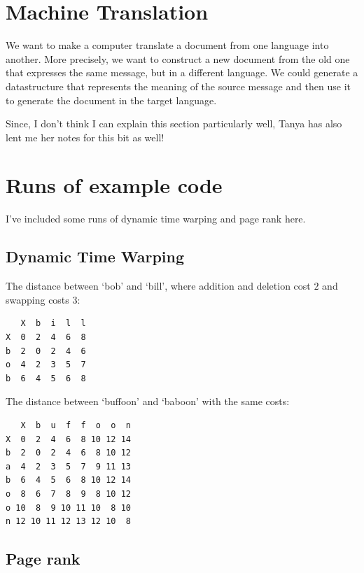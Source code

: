 \section{Machine Translation}

We want to make a computer translate a document from one language into another.
More precisely, we want to construct a new document from the old one that
expresses the same message, but in a different language. We could generate a
datastructure that represents the meaning of the source message and then use it
to generate the document in the target language.

Since, I don't think I can explain this section particularly well, Tanya has
also lent me her notes for this bit as well!



\section{Runs of example code}

I've included some runs of dynamic time warping and page rank here.

\subsection{Dynamic Time Warping}

The distance between `bob' and `bill', where addition and deletion cost $2$ and
swapping costs $3$:

\begin{verbatim}
   X  b  i  l  l
X  0  2  4  6  8 
b  2  0  2  4  6 
o  4  2  3  5  7 
b  6  4  5  6  8 
\end{verbatim}

The distance between `buffoon' and `baboon' with the same costs:

\begin{verbatim}
   X  b  u  f  f  o  o  n
X  0  2  4  6  8 10 12 14 
b  2  0  2  4  6  8 10 12 
a  4  2  3  5  7  9 11 13 
b  6  4  5  6  8 10 12 14 
o  8  6  7  8  9  8 10 12 
o 10  8  9 10 11 10  8 10 
n 12 10 11 12 13 12 10  8 
\end{verbatim}

\subsection{Page rank}


